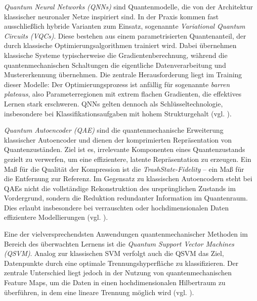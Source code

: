 \textit{Quantum Neural Networks (QNNs)} 
sind Quantenmodelle, die von der Architektur klassischer neuronaler Netze inspiriert sind. In der Praxis kommen fast ausschließlich hybride Varianten zum Einsatz, sogenannte \textit{Variational Quantum Circuits (VQCs)}. Diese bestehen aus einem parametrisierten Quantenanteil, der durch klassische Optimierungsalgorithmen trainiert wird. Dabei übernehmen klassische Systeme typischerweise die Gradientenberechnung, während die quantenmechanischen Schaltungen die eigentliche Datenverarbeitung und Mustererkennung übernehmen. Die zentrale Herausforderung liegt im Training dieser Modelle: Der Optimierungsprozess ist anfällig für sogenannte \textit{barren plateaus}, also Parameterregionen mit extrem flachen Gradienten, die effektives Lernen stark erschweren. QNNs gelten dennoch als Schlüsseltechnologie, insbesondere bei Klassifikationsaufgaben mit hohem Strukturgehalt (vgl. \cite{liuQuantumTrainRethinkingHybrid2024}).

\vspace{0.3cm}
\textit{Quantum Autoencoder (QAE)} sind die quantenmechanische Erweiterung klassischer Autoencoder und dienen der komprimierten Repräsentation von Quantenzuständen. Ziel ist es, irrelevante Komponenten eines Quantenzustands gezielt zu verwerfen, um eine effizientere, latente Repräsentation zu erzeugen. Ein Maß für die Qualität der Kompression ist die \textit{TrashState-Fidelity} – ein Maß für die Entfernung zur Referenz. Im Gegensatz zu klassischen Autoencodern steht bei QAEs nicht die vollständige Rekonstruktion des ursprünglichen Zustands im Vordergrund, sondern die Reduktion redundanter Information im Quantenraum. Dies erlaubt insbesondere bei verrauschten oder hochdimensionalen Daten effizientere Modellierungen (vgl. \cite{ngairangbam_anomaly_2022, schuld_et_al_quantum_2019}).

\vspace{0.3cm}

Eine der vielversprechendsten Anwendungen quantenmechanischer Methoden im Bereich des überwachten Lernens ist die \textit{Quantum Support Vector Machines (QSVM)}. Analog zur klassischen SVM verfolgt auch die QSVM das Ziel, Datenpunkte durch eine optimale Trennungshyperfläche zu klassifizieren. Der zentrale Unterschied liegt jedoch in der Nutzung von quantenmechanischen Feature Maps, um die Daten in einen hochdimensionalen Hilbertraum zu überführen, in dem eine lineare Trennung möglich wird (vgl. \cite{kavithaQuantumMachineLearning2024}).


